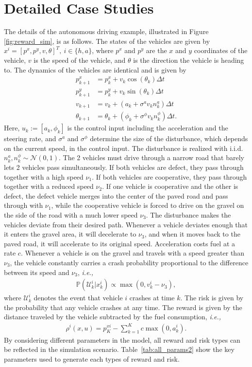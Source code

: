 \documentclass[letterpaper]{article} %
\begin{document}
\section{Detailed Case Studies}
The details of the autonomous driving example, illustrated in Figure \ref{fig:reward_sim}, is as follows. The states of the vehicles are given by $x^i=[p^x,p^y,v,\theta]^T,\ i\in\{h,a\}$, where $p^x$ and $p^y$ are the $x$ and $y$ coordinates of the vehicle, $v$ is the speed of the vehicle, and $\theta$ is the direction the vehicle is heading to. The dynamics of the vehicles are identical and is given by
\begin{align}
    p^x_{k+1}&=p^x_k+v_k\cos(\theta_k)\Delta t\\
    p^y_{k+1}&=p^y_k+v_k\sin(\theta_k)\Delta t\\
    v_{k+1}&=v_k+(a_k+\sigma^a v_kn^a_k)\Delta t\\
    \theta_{k+1}&=\theta_k+(\phi_k+\sigma^\phi v_kn^{\phi}_k)\Delta t.
\end{align}
Here, $u_k:=[a_k,\phi_k]$ is the control input including the acceleration and the steering rate, and $\sigma^a$ and $\sigma^\phi$ determine the size of the disturbance, which depends on the current speed, in the control input. The disturbance is realized with i.i.d. $n^a_k,n^\phi_k\sim\mathcal{N}(0,1)$. The 2 vehicles must drive through a narrow road that barely lets 2 vehicles pass simultaneously. If both vehicles are defect, they pass through together with a high speed $\nu_1$. If both vehicles are cooperative, they pass through together with a reduced speed $\nu_2$. If one vehicle is cooperative and the other is defect, the defect vehicle merges into the center of the paved road and pass through with $\nu_1$, while the cooperative vehicle is forced to drive on the gravel on the side of the road with a much lower speed $\nu_3$. The disturbance makes the vehicles deviate from their desired path. Whenever a vehicle deviates enough that it enters the gravel area, it will decelerate to $\nu_3$, and when it moves back to the paved road, it will accelerate to its original speed. Acceleration costs fuel at a rate $c$. Whenever a vehicle is on the gravel and travels with a speed greater than $\nu_3$, the vehicle constantly carries a crash probability proportional to the difference between its speed and $\nu_3$, \textit{i.e.,}
\begin{align}
    \mathbb{P}(\mathcal{U}^i_k|x^i_k)\propto \max(0,v^i_k-\nu_3),
\end{align}
where $\mathcal{U}^i_k$ denotes the event that vehicle $i$ crashes at time $k$. The risk is given by the probability that any vehicle crashes at any time. The reward is given by the distance traveled by the vehicle subtracted by the fuel consumption, \textit{i.e.,}
\begin{align}
    \rho^i(x,u)=p^{xi}_K-\sum_{k=1}^{K}c\max(0,a^i_k).
\end{align}
By considering different parameters in the model, all reward and risk types can be reflected in the simulation scenario. Table~\ref{tab:all_params2} show the key parameters used to generate each types of reward and risk.
\end{document}
